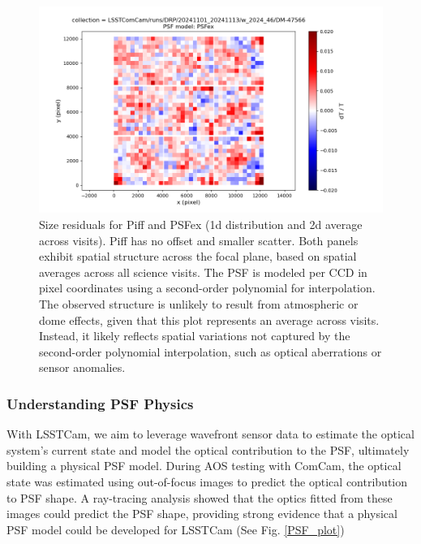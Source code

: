 \begin{figure}
	\includegraphics[scale=0.3]{figures/0_dT_2d_PSFex}
        \caption{\small Size residuals for Piff and PSFex (1d distribution and 2d average across visits). Piff has no offset and smaller scatter. Both panels 
        exhibit spatial structure across the focal plane, based on spatial averages across all science visits. The PSF is modeled per CCD in pixel coordinates 
        using a second-order polynomial for interpolation. The observed structure is unlikely to result from atmospheric or dome effects, given that this plot 
        represents an average across visits. Instead, it likely reflects spatial variations not captured by the second-order polynomial interpolation, such as 
        optical aberrations or sensor anomalies.}
        \label{DT_plot}
\end{figure}


\subsubsection{Understanding PSF Physics}


With LSSTCam, we aim to leverage wavefront sensor data to estimate the optical system's current state and model the optical contribution to the PSF, ultimately building a physical PSF model. During AOS testing with ComCam, the optical state was estimated using out-of-focus images to predict the optical contribution to PSF shape. A ray-tracing analysis showed that the optics fitted from these images could predict the PSF shape, providing strong evidence that a physical PSF model could be developed for LSSTCam (See  Fig. \ref{PSF_plot})


